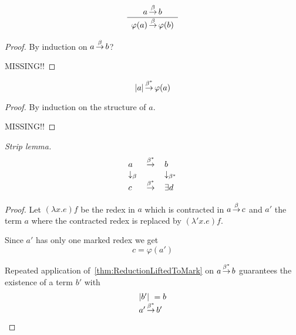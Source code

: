 {    \begin{lemma}
        \label{thm:PhiReduction}
        $$
        \begin{array}{c} 
            a {\,\stackrel{\beta}{\to}\,} b
         \\ \hline 
            \varphi(a) {\,\stackrel{\beta}{\to}\,} \varphi(b)
        \end{array}
        $$

        \begin{proof}

            By induction on $a {\,\stackrel{\beta}{\to}\,} b$?

            MISSING!!
        \end{proof}
    \end{lemma}



    \begin{lemma}
        \label{thm:ErasePhi}
        $$
        |a| {\,\stackrel{\beta^*}{\to}\,} \varphi(a)
        $$

        \begin{proof}
            By induction on the structure of $a$.

            MISSING!!
        \end{proof}
    \end{lemma}






    \begin{lemma}
        \label{thm:StripLemma}
        \emph{Strip lemma.}
        $$
        \begin{array}{lll}
            a & {\,\stackrel{\beta^*}{\to}\,} & b
            \\
            \downarrow_\beta & & \downarrow_{\beta^*}
            \\
            c & {\,\stackrel{\beta^*}{\to}\,} & \exists d
        \end{array}
        $$

        \begin{proof}
            Let $(\lambda x.e)f$ be the redex in $a$ which is contracted in $a
            {\,\stackrel{\beta}{\to}\,} c$ and $a'$ the term $a$ where the contracted redex is
            replaced by $(\lambda' x. e)f$.

            Since $a'$ has only one marked redex we get
            $$
            c = \varphi(a')
            $$

            Repeated application of~\ref{thm:ReductionLiftedToMark} on $a
            {\,\stackrel{\beta^*}{\to}\,} b$ guarantees the existence of a term $b'$ with
            $$
            \vertlist{
                |b'| = b
                \\
                a' \reducestar b'
            }
            $$


\end{proof}
\end{lemma}}
